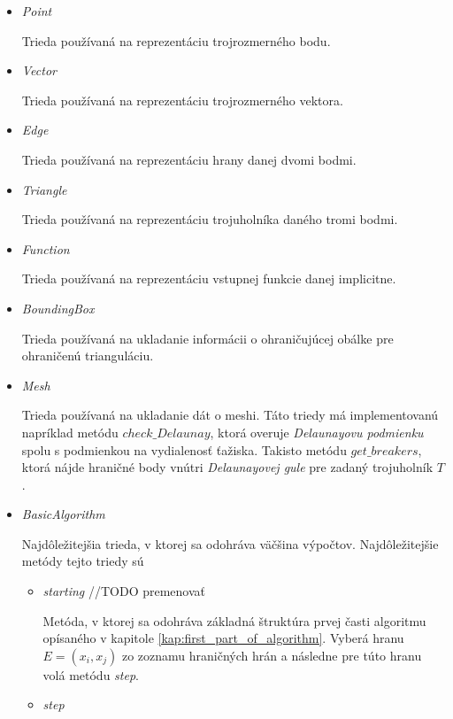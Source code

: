 \begin{itemize}
    \item{
        \textit{Point}

        Trieda používaná na reprezentáciu trojrozmerného bodu.
    }
    \item{
        \textit{Vector}
        
        Trieda používaná na reprezentáciu trojrozmerného vektora. 
    }
    \item{
        \textit{Edge}

        Trieda používaná na reprezentáciu hrany danej dvomi bodmi.
    }
    \item{
        \textit{Triangle}

        Trieda používaná na reprezentáciu trojuholníka daného tromi bodmi.
    }
    \item{
        \textit{Function}

        Trieda používaná na reprezentáciu vstupnej funkcie danej implicitne. 
    }
    \item{
        \textit{BoundingBox}

        Trieda používaná na ukladanie informácii o ohraničujúcej obálke pre ohraničenú trianguláciu.
    }
    \item{
        \textit{Mesh}

        Trieda používaná na ukladanie dát o meshi. Táto triedy má implementovanú napríklad metódu
        $check\_Delaunay$, ktorá overuje \textit{Delaunayovu podmienku} spolu s podmienkou
        na vydialenosť ťažiska. Takisto metódu $get\_breakers$, ktorá nájde hraničné body 
        vnútri \textit{Delaunayovej gule} pre zadaný trojuholník $T$.
    }
    \item{
        \textit{BasicAlgorithm}

        Najdôležitejšia trieda, v ktorej sa odohráva väčšina výpočtov. Najdôležitejšie metódy 
        tejto triedy sú
        \begin{itemize}
            \item{
                \textit{starting} //TODO premenovať
                
                Metóda, v ktorej sa odohráva základná štruktúra prvej časti algoritmu opísaného v kapitole 
                \ref{kap:first_part_of_algorithm}. Vyberá hranu $E=(x_i, x_j)$ zo zoznamu hraničných 
                hrán a následne pre túto hranu volá metódu \textit{step}.
            }
            \item{
                \textit{step}

}
\end{itemize}}
\end{itemize}
